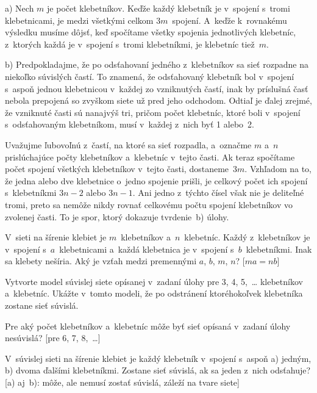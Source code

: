 {%
a) Nech $m$ je počet klebetníkov. Keďže každý klebetník je v~spojení s~tromi klebetnicami, je medzi všetkými celkom $3m$~spojení. A~keďže k~rovnakému výsledku musíme dôjsť, keď spočítame všetky spojenia jednotlivých klebetníc, z~ktorých každá
je v~spojení s~tromi klebetníkmi, je klebetníc tiež~$m$.

\smallskip
b) Predpokladajme, že po odsťahovaní jedného z~klebetníkov sa sieť rozpadne
na niekoľko súvislých častí.
To znamená, že odsťahovaný klebetník bol v~spojení s~aspoň jednou
klebetnicou v~každej zo vzniknutých častí, inak by príslušná časť
nebola prepojená so zvyškom siete už pred jeho odchodom. Odtiaľ je ďalej
zrejmé, že vzniknuté časti sú nanajvýš tri, pričom počet klebetníc, ktoré boli
v~spojení s~odsťahovaným klebetníkom, musí v~každej z~nich byť 1 alebo~2.

Uvažujme ľubovoľnú z~častí, na ktoré sa sieť rozpadla, a~označme $m$ a~$n$
prislúchajúce počty klebetníkov a~klebetníc v~tejto časti. Ak teraz
spočítame počet spojení všetkých klebetníkov v~tejto časti, dostaneme~$3m$.
Vzhľadom na to, že jedna alebo dve klebetnice o~jedno spojenie prišli,
je celkový počet ich spojení s~klebetníkmi $3n-2$ alebo $3n-1$. Ani
jedno z~týchto čísel však nie je deliteľné tromi, preto sa nemôže nikdy
rovnať celkovému počtu spojení klebetníkov vo zvolenej časti. To je spor,
ktorý dokazuje tvrdenie~b) úlohy.

V~sieti na šírenie klebiet je $m$~klebetníkov a~$n$~klebetníc. Každý
z~klebetníkov je v~spojení s~$a$~klebetnicami a~každá klebetnica je v~spojení s~$b$~klebetníkmi.
Inak sa klebety nešíria. Aký je vzťah medzi premennými $a$, $b$, $m$, $n$? [$ma=nb$]

Vytvorte model súvislej siete opísanej v~zadaní úlohy pre 3, 4, 5,~{\dots}
klebetníkov a~klebetníc. Ukážte v~tomto modeli, že po odstránení
ktoréhokoľvek klebetníka zostane sieť súvislá.

Pre aký počet klebetníkov a~klebetníc môže byť sieť opísaná v~zadaní úlohy nesúvislá? [pre 6, 7, 8,~{\dots}]

V~súvislej sieti na šírenie klebiet je každý klebetník v~spojení s~aspoň a)
jedným, b) dvoma ďalšími klebetníkmi. Zostane sieť súvislá, ak sa jeden z~nich odsťahuje?
[a) aj~b): môže, ale nemusí zostať súvislá, záleží na tvare siete]
}

